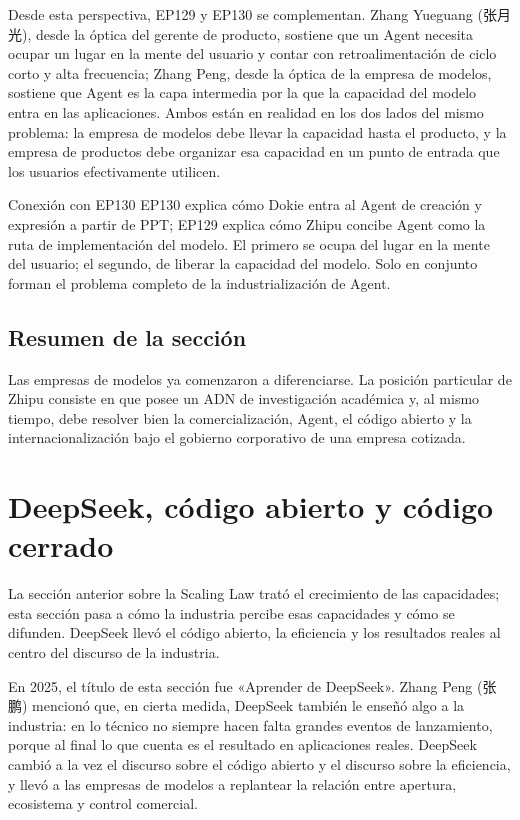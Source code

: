 \documentclass[a4paper]{article}
\begin{document}
Desde esta perspectiva, EP129 y EP130 se complementan. Zhang Yueguang (张月光), desde la óptica del gerente de producto, sostiene que un Agent necesita ocupar un lugar en la mente del usuario y contar con retroalimentación de ciclo corto y alta frecuencia; Zhang Peng, desde la óptica de la empresa de modelos, sostiene que Agent es la capa intermedia por la que la capacidad del modelo entra en las aplicaciones. Ambos están en realidad en los dos lados del mismo problema: la empresa de modelos debe llevar la capacidad hasta el producto, y la empresa de productos debe organizar esa capacidad en un punto de entrada que los usuarios efectivamente utilicen.

\begin{knowledgebox}{Conexión con EP130}
EP130 explica cómo Dokie entra al Agent de creación y expresión a partir de PPT; EP129 explica cómo Zhipu concibe Agent como la ruta de implementación del modelo. El primero se ocupa del lugar en la mente del usuario; el segundo, de liberar la capacidad del modelo. Solo en conjunto forman el problema completo de la industrialización de Agent.
\end{knowledgebox}

\subsection{Resumen de la sección}

Las empresas de modelos ya comenzaron a diferenciarse. La posición particular de Zhipu consiste en que posee un ADN de investigación académica y, al mismo tiempo, debe resolver bien la comercialización, Agent, el código abierto y la internacionalización bajo el gobierno corporativo de una empresa cotizada.
\section{DeepSeek, código abierto y código cerrado}

La sección anterior sobre la Scaling Law trató el crecimiento de las capacidades; esta sección pasa a cómo la industria percibe esas capacidades y cómo se difunden. DeepSeek llevó el código abierto, la eficiencia y los resultados reales al centro del discurso de la industria.

En 2025, el título de esta sección fue «Aprender de DeepSeek». Zhang Peng (张鹏) mencionó que, en cierta medida, DeepSeek también le enseñó algo a la industria: en lo técnico no siempre hacen falta grandes eventos de lanzamiento, porque al final lo que cuenta es el resultado en aplicaciones reales. DeepSeek cambió a la vez el discurso sobre el código abierto y el discurso sobre la eficiencia, y llevó a las empresas de modelos a replantear la relación entre apertura, ecosistema y control comercial.
\end{document}
